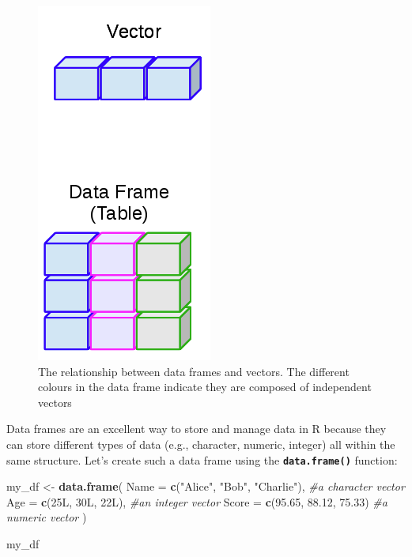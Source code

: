 \documentclass[
]{book}
\newenvironment{Shaded}{\begin{snugshade}}{\end{snugshade}}
\newcommand{\AttributeTok}[1]{\textcolor[rgb]{0.13,0.29,0.53}{#1}}
\newcommand{\CommentTok}[1]{\textcolor[rgb]{0.56,0.35,0.01}{\textit{#1}}}
\newcommand{\FloatTok}[1]{\textcolor[rgb]{0.00,0.00,0.81}{#1}}
\newcommand{\FunctionTok}[1]{\textcolor[rgb]{0.13,0.29,0.53}{\textbf{#1}}}
\newcommand{\NormalTok}[1]{#1}
\newcommand{\OtherTok}[1]{\textcolor[rgb]{0.56,0.35,0.01}{#1}}
\newcommand{\StringTok}[1]{\textcolor[rgb]{0.31,0.60,0.02}{#1}}
\begin{document}
\begin{figure}
\centering
\includegraphics{img/03-dataframes_vectors.png}
\caption{\label{fig:unnamed-chunk-83}The relationship between data frames and vectors. The different colours in the data frame indicate they are composed of independent vectors}
\end{figure}

Data frames are an excellent way to store and manage data in R because they can store different types of data (e.g., character, numeric, integer) all within the same structure. Let's create such a data frame using the \textbf{\texttt{data.frame()}} function:

\begin{Shaded}
\begin{Highlighting}[]
\NormalTok{my\_df }\OtherTok{\textless{}{-}} \FunctionTok{data.frame}\NormalTok{(}
  \AttributeTok{Name =} \FunctionTok{c}\NormalTok{(}\StringTok{"Alice"}\NormalTok{, }\StringTok{"Bob"}\NormalTok{, }\StringTok{"Charlie"}\NormalTok{), }\CommentTok{\#a character vector}
  \AttributeTok{Age =} \FunctionTok{c}\NormalTok{(25L, 30L, 22L), }\CommentTok{\#an integer vector}
  \AttributeTok{Score =} \FunctionTok{c}\NormalTok{(}\FloatTok{95.65}\NormalTok{, }\FloatTok{88.12}\NormalTok{, }\FloatTok{75.33}\NormalTok{) }\CommentTok{\#a numeric vector}
\NormalTok{)}

\NormalTok{my\_df}
\end{Highlighting}
\end{Shaded}
\end{document}
